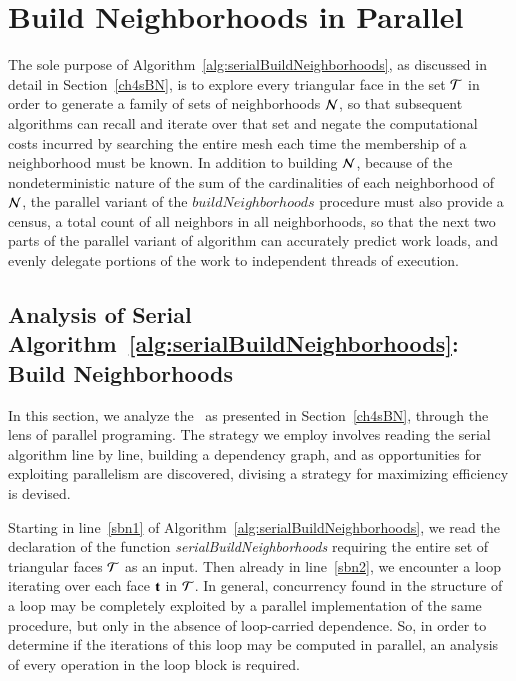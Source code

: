 \section{Build Neighborhoods in Parallel}
\label{ch5sBNP}
The sole purpose of Algorithm~\ref{alg:serialBuildNeighborhoods}, as discussed in detail in Section~\ref{ch4sBN}, is to explore every triangular face in the set $\mathcal{T}$ in order to generate a family of sets of neighborhoods $\mathcal{N}$, so that subsequent algorithms can recall and iterate over that set and negate the computational costs incurred by searching the entire mesh each time the membership of a neighborhood must be known. In addition to building $\mathcal{N}$, because of the nondeterministic nature of the sum of the cardinalities of each neighborhood of $\mathcal{N}$, the parallel variant of the $\mathit{buildNeighborhoods}$ procedure must also provide a \gls{census}, a total count of all neighbors in all neighborhoods, so that the next two parts of the parallel variant of  algorithm can accurately predict work loads, and evenly delegate portions of the work to independent threads of execution.

%
%
\subsection{Analysis of Serial Algorithm~\ref{alg:serialBuildNeighborhoods}: Build Neighborhoods}
\label{ch5sBNPssASABN}
In this section, we analyze the~ as presented in Section~\ref{ch4sBN}, through the lens of parallel programing. The strategy we employ involves reading the serial algorithm line by line, building a dependency graph, and as opportunities for exploiting parallelism are discovered, divising a strategy for maximizing efficiency is devised.

Starting in line~\ref{sbn1} of Algorithm~\ref{alg:serialBuildNeighborhoods}, we read the declaration of the function \textit{serialBuildNeighborhoods} requiring the entire set of triangular faces $\mathcal{T}$ as an input. Then already in line~\ref{sbn2}, we encounter a loop iterating over each face $\mathbf{t}$ in $\mathcal{T}$. In general, concurrency found in the structure of a loop may be completely exploited by a parallel implementation of the same procedure, but only in the absence of loop-carried dependence. So, in order to determine if the iterations of this loop may be computed in parallel, an analysis of every operation in the loop block is required.

